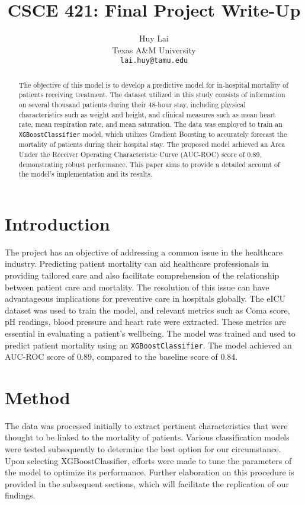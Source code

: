 \documentclass{article}
\title{CSCE 421: Final Project Write-Up}
\author{
    Huy Lai \\
    Texas A\&M University\\
    \texttt{lai.huy@tamu.edu} \\
}
\begin{document}
\maketitle

\begin{abstract}
  \begin{flushleft} 
   The objective of this model is to develop a predictive model for in-hospital mortality of patients receiving treatment.
   The dataset utilized in this study consists of information on several thousand patients during their 48-hour stay, including physical characteristics such as weight and height, and clinical measures such as mean heart rate, mean respiration rate, and mean  saturation.
   The data was employed to train an \verb+XGBoostClassifier+ model, which utilizes Gradient Boosting to accurately forecast the mortality of patients during their hospital stay.
   The proposed model achieved an Area Under the Receiver Operating Characteristic Curve (AUC-ROC) score of 0.89, demonstrating robust performance.
   This paper aims to provide a detailed account of the model's implementation and its results.
  \end{flushleft} 
\end{abstract}



\section{Introduction}
\begin{flushleft} 

The project has an objective of addressing a common issue in the healthcare industry.
Predicting patient mortality can aid healthcare professionals in providing tailored care and also facilitate comprehension of the relationship between patient care and mortality.
The resolution of this issue can have advantageous implications for preventive care in hospitals globally.
The eICU dataset was used to train the model, and relevant metrics such as Coma score, pH readings, blood pressure and heart rate were extracted.
These metrics are essential in evaluating a patient's wellbeing.
The model was trained and used to predict patient mortality using an \verb+XGBoostClassifier+.
The model achieved an AUC-ROC score of 0.89, compared to the baseline score of 0.84.

\end{flushleft}
    
\section{Method}
\begin{flushleft} 
The data was processed initially to extract pertinent characteristics that were thought to be linked to the mortality of patients.
Various classification models were tested subsequently to determine the best option for our circumstance.
Upon selecting XGBoostClassifier, efforts were made to tune the parameters of the model to optimize its performance.
Further elaboration on this procedure is provided in the subsequent sections, which will facilitate the replication of our findings.
\end{flushleft}
    
\end{document}
